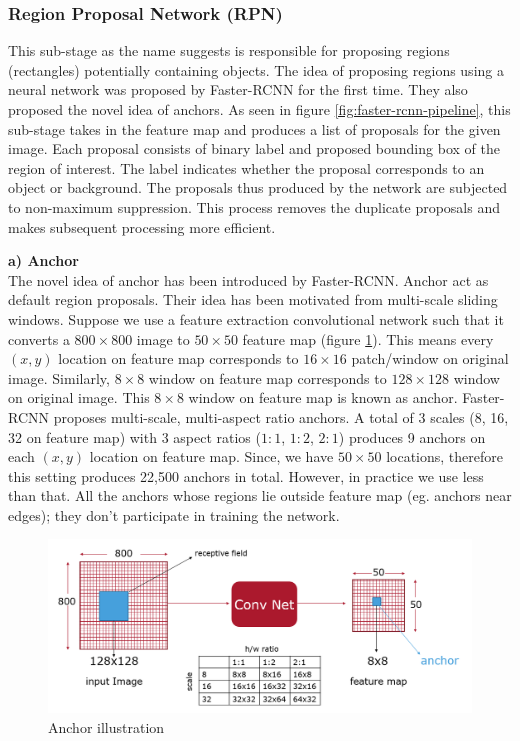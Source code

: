 \subsubsection{Region Proposal Network (RPN)}
\label{sec:RPN}
This sub-stage as the name suggests is responsible for proposing regions (rectangles) potentially containing objects. The idea of proposing regions using a neural network was proposed by Faster-RCNN for the first time. They also proposed the novel idea of anchors. As seen in figure \ref{fig:faster-rcnn-pipeline}, this sub-stage takes in the feature map and produces a list of proposals for the given image. Each proposal consists of binary label and proposed bounding box of the region of interest. The label indicates whether the proposal corresponds to an object or background. The proposals thus produced by the network are subjected to non-maximum suppression. This process removes the duplicate proposals and makes subsequent processing more efficient.  

\textbf{a) Anchor} \\
The novel idea of anchor has been introduced by Faster-RCNN. Anchor act as default region proposals. Their idea has been motivated from multi-scale sliding windows. Suppose we use a feature extraction convolutional network such that it converts a $800\times800$ image to $50\times50$ feature map (figure \ref{fig:anchors}). This means every $(x,y)$ location on feature map corresponds to $16\times16$ patch/window on original image. Similarly, $8\times8$ window on feature map corresponds to $128\times128$ window on original image. This $8\times8$ window on feature map is known as anchor. Faster-RCNN proposes multi-scale, multi-aspect ratio anchors. A total of 3 scales (8, 16, 32 on feature map) with 3 aspect ratios ($1:1$, $1:2$, $2:1$) produces 9 anchors on each $(x,y)$ location on feature map. Since, we have $50\times50$ locations, therefore this setting produces 22,500 anchors in total. However, in practice we use less than that. All the anchors whose regions lie outside feature map (eg. anchors near edges); they don't participate in training the network. 

\begin{figure}
    \centering
    \includegraphics[width=\linewidth]{images/anchors.PNG}
    \caption[Anchor illustration]{Anchor illustration}
    \label{fig:anchors}
\end{figure}


